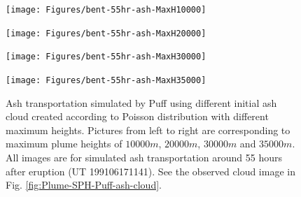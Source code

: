 \documentclass[draft,linenumbers]{agujournal2019}
\begin{document}
\begin{figure}[!htb]
    \centering
    \begin{minipage}{.245\textwidth}
        \centering
        \texttt{[image: Figures/bent-55hr-ash-MaxH10000]}
    \end{minipage}%
    \begin{minipage}{.245 \textwidth}
        \centering
        \texttt{[image: Figures/bent-55hr-ash-MaxH20000]}
    \end{minipage}%
    \begin{minipage}{.245 \textwidth}
        \centering
        \texttt{[image: Figures/bent-55hr-ash-MaxH30000]}
    \end{minipage}%
    \begin{minipage}{.245 \textwidth}
        \centering
        \texttt{[image: Figures/bent-55hr-ash-MaxH35000]}
    \end{minipage}%
    \caption{Ash transportation simulated by Puff using different initial ash cloud created according to Poisson distribution with different maximum heights. Pictures from left to right are corresponding to maximum plume heights of $10000 m$, $20000 m$, $30000 m$ and $35000 m$. All images are for simulated ash transportation around 55 hours after eruption (UT 199106171141). See the observed cloud image in Fig. \ref{fig:Plume-SPH-Puff-ash-cloud}.}
    \label{fig:Various-Maximum-height-Pinatubo-ash-cloud}
\end{figure}
\end{document}
